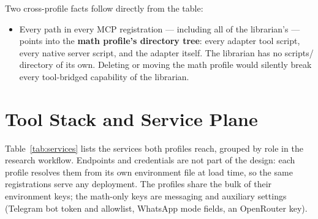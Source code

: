 \documentclass[10pt]{article}
\newcommand{\mono}[1]{{\ttfamily\small #1}}
\begin{document}
Two cross-profile facts follow directly from the table:

\begin{itemize}
    \item Every path in every MCP registration --- including all of the librarian's --- points into
    the \textbf{math profile's directory tree}: every adapter tool script, every native server
    script, and the adapter itself. The librarian has no \mono{scripts/} directory of its own.
    Deleting or moving the math profile would silently break every tool-bridged capability of the
    librarian.
\end{itemize}

\section{Tool Stack and Service Plane}\label{sec:services}

Table~\ref{tab:services} lists the services both profiles reach, grouped by role in the research
workflow. Endpoints and credentials are not part of the design: each profile resolves them from its
own environment file at load time, so the same registrations serve any deployment. The profiles
share the bulk of their environment keys; the math-only keys are messaging and auxiliary settings
(Telegram bot token and allowlist, WhatsApp mode fields, an OpenRouter key).
\end{document}
